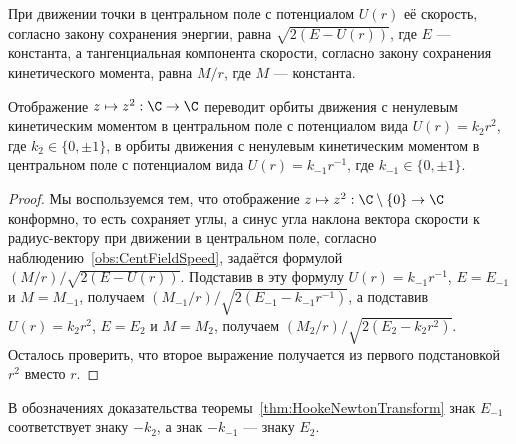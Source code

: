 \documentclass[
	extrafontsizes,
	11pt,
	hyphens,
]{memoir}
\begin{document}
\begin{observation}
При движении точки в центральном поле с потенциалом \(U(r)\) её скорость, согласно закону сохранения энергии, равна \(\sqrt{2(E - U(r))}\), где \(E\) --- константа,%
\label{obs:CentFieldSpeed}
а тангенциальная компонента скорости, согласно закону сохранения кинетического момента, равна \(M/r\), где \(M\) --- константа.
\end{observation}


\begin{theorem}
Отображение \(z \mapsto z^2 : \C \to \C\) переводит%
\label{thm:HookeNewtonTransform}
орбиты движения
с ненулевым кинетическим моментом
в центральном поле с потенциалом вида
\(U(r) = k_2 r^2\), где \(k_2 \in \{0, \pm 1\}\),
в орбиты движения
с ненулевым кинетическим моментом
в центральном поле с потенциалом вида
\(U(r) = k_{-1} r^{-1}\), где \(k_{-1} \in \{0, \pm 1\}\).
\end{theorem}

\begin{proof}%
Мы воспользуемся тем, что отображение \(z \mapsto z^2 : \C \setminus \{0\} \to \C\) конформно, то есть сохраняет углы,
а синус угла наклона вектора скорости к радиус-вектору при движении в центральном поле,
согласно наблюдению~\ref{obs:CentFieldSpeed},
задаётся формулой
\((M/r) / \sqrt{2(E - U(r))}\).
Подставив в эту формулу \(U(r) = k_{-1} r^{-1}\), \(E = E_{-1}\) и \(M = M_{-1}\), получаем \((M_{-1}/r) / \sqrt{2(E_{-1} - k_{-1} r^{-1})}\), а подставив \(U(r) = k_2 r^2\), \(E = E_2\) и \(M = M_2\), получаем \((M_2 / r) / \sqrt{2(E_2 - k_2 r^2)}\).
Осталось проверить, что второе выражение получается из первого подстановкой \(r^2\) вместо \(r\).
\end{proof}

\begin{remark}
В обозначениях доказательства теоремы~\ref{thm:HookeNewtonTransform} знак \(E_{-1}\) соответствует знаку \(- k_2\), а знак \(- k_{-1}\) --- знаку \(E_2\).
\end{remark}
\end{document}

